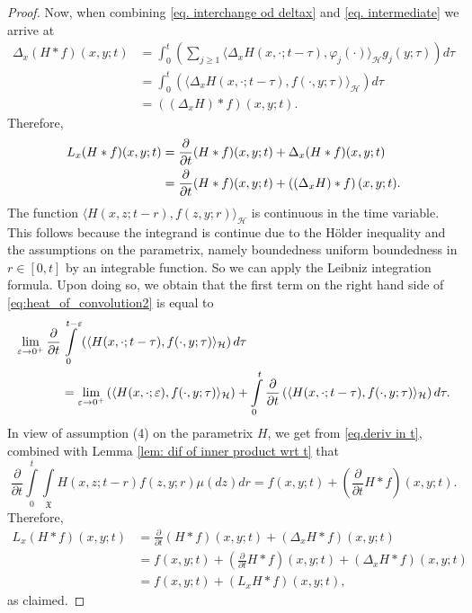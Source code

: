 \documentclass[10pt,a4paper]{amsart}
\newcommand{\X}{\mathfrak{X}}
\begin{document}
\begin{proof}
Now, when combining \eqref{eq. interchange od deltax} and \eqref{eq. intermediate} we arrive at
\begin{align*}
\Delta_{x}(H\ast f)(x,y;t) &= \int_0^t \left( \sum_{j\geq 1} \langle \Delta_xH(x,\cdot;t-\tau),\varphi_j(\cdot) \rangle_\mathcal{H}  g_j(y;\tau)  \right)d\tau \\&=  \int_0^t \left( \langle \Delta_x H(x,\cdot;t-\tau),f(\cdot,y;\tau) \rangle_\mathcal{H}  \right)d\tau \\&=  \left( (\Delta_{x}H)\ast f\right)(x,y;t).
\end{align*}
Therefore,
\begin{align}\notag
L_{x}(H\ast f)(x,y;t)&=
    \frac{\partial}{\partial t}(H\ast f)(x,y;t)
    + \Delta_{x}(H\ast f)(x,y;t)\\ &=
  \frac{\partial}{\partial t}(H\ast f)(x,y;t)+  \left( (\Delta_{x}H)\ast f\right)(x,y;t).\label{eq:heat_of_convolution2}
\end{align}
The function $\langle H(x,z;t-r),f(z,y;r) \rangle_{\mathcal{H}}$ is continuous in the time variable.
This follows because the integrand is continue due to the H\"older inequality and the assumptions on the parametrix, namely boundedness
uniform boundedness in $r\in[0,t]$ by an integrable function.  So we can apply the
Leibniz integration formula.  Upon doing so, we obtain that
the first term on the right hand side of \eqref{eq:heat_of_convolution2} is equal to
\begin{align} \label{eq.deriv in t}
\lim_{\varepsilon\to 0^+}\frac{\partial}{\partial t}&\int\limits _{0}^{t-\varepsilon}\left( \langle H(x,\cdot;t-\tau),f(\cdot,y;\tau) \rangle_\mathcal{H}  \right)d\tau \\&
=\lim_{\varepsilon\to 0^+}\left( \langle H(x,\cdot;\varepsilon),f(\cdot,y;\tau) \rangle_\mathcal{H}  \right) +\int\limits _{0}^{t} \frac{\partial}{\partial t}\left( \langle H(x,\cdot;t-\tau),f(\cdot,y;\tau) \rangle_\mathcal{H}  \right)d\tau .\notag
\end{align}
In view of assumption (4) on the parametrix $H$, we get from \eqref{eq.deriv in t}, combined with Lemma \ref{lem: dif of inner product wrt t} that
$$
\frac{\partial}{\partial t}\int\limits _{0}^{t}\int\limits_{\X}H(x,z;t-r)f(z,y;r) \mu(dz)dr= f(x,y;t) + \left(\frac{\partial}{\partial t}H\ast f\right)(x,y;t).
$$
Therefore,
\begin{align*}
L_{x}(H\ast f)(x,y;t) &=
  \frac{\partial}{\partial t}(H\ast f)(x,y;t)+   (\Delta_{x}H\ast f)(x,y;t)
\\&=f(x,y;t)+\left(\frac{\partial}{\partial t}H\ast f\right)(x,y;t)+(\Delta_{x}H\ast f)(x,y;t)
\\&=f(x,y;t)+(L_{x}H\ast f)(x,y;t),
\end{align*}
as claimed.
\end{proof}
\end{document}
